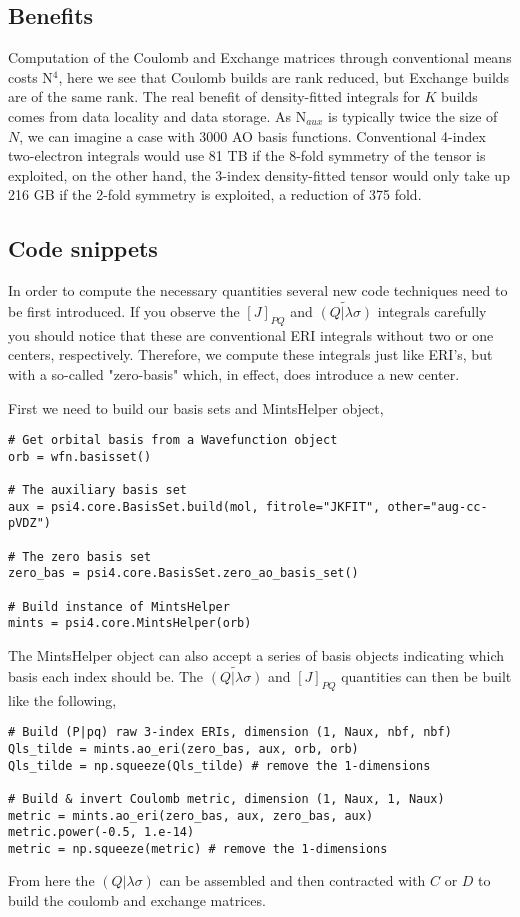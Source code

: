 \documentclass[aip,jcp,preprint,superscriptaddress,floatfix]{revtex4-1}
\begin{document}
\subsection{Benefits}
Computation of the Coulomb and Exchange matrices through conventional means costs N$^4$, here we see that Coulomb builds are rank reduced, but Exchange builds are of the same rank.
The real benefit of density-fitted integrals for $K$ builds comes from data locality and data storage.
As N$_{aux}$ is typically twice the size of $N$, we can imagine a case with 3000 AO basis functions.
Conventional 4-index two-electron integrals would use 81 TB if the 8-fold symmetry of the tensor is exploited, on the other hand, the 3-index density-fitted tensor would only take up 216 GB if the 2-fold symmetry is exploited, a reduction of 375 fold.

\subsection{Code snippets}
In order to compute the necessary quantities several new code techniques need to be first introduced.
If you observe the $[J]_{PQ} $ and $\widetilde{(Q| \lambda \sigma)} $ integrals carefully you should
notice that these are conventional ERI integrals without two or one centers, respectively.
Therefore, we compute these integrals just like ERI's, but with a so-called "zero-basis" which,
in effect, does introduce a new center.

First we need to build our basis sets and MintsHelper object,
\begin{verbatim}
# Get orbital basis from a Wavefunction object
orb = wfn.basisset()

# The auxiliary basis set
aux = psi4.core.BasisSet.build(mol, fitrole="JKFIT", other="aug-cc-pVDZ")

# The zero basis set
zero_bas = psi4.core.BasisSet.zero_ao_basis_set()

# Build instance of MintsHelper
mints = psi4.core.MintsHelper(orb)
\end{verbatim}

The MintsHelper object can also accept a series of basis objects indicating which basis each index should be.
The $\widetilde{(Q| \lambda \sigma)} $ and $[J]_{PQ} $ quantities can then be built like the following,
\begin{verbatim}
# Build (P|pq) raw 3-index ERIs, dimension (1, Naux, nbf, nbf)
Qls_tilde = mints.ao_eri(zero_bas, aux, orb, orb)
Qls_tilde = np.squeeze(Qls_tilde) # remove the 1-dimensions

# Build & invert Coulomb metric, dimension (1, Naux, 1, Naux)
metric = mints.ao_eri(zero_bas, aux, zero_bas, aux)
metric.power(-0.5, 1.e-14)
metric = np.squeeze(metric) # remove the 1-dimensions
\end{verbatim}

From here the $(Q| \lambda \sigma)$ can be assembled and then contracted with $C$ or $D$ to build the coulomb and exchange matrices.



\end{document}
